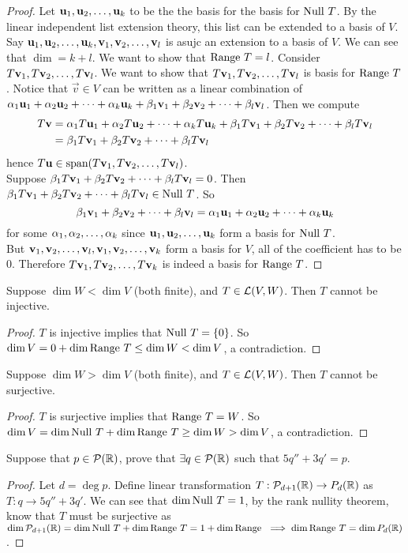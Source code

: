 \begin{proof}
    Let $\li{\vec u}k$ to be the the basis for the basis for $\nul T$. By the linear independent list extension theory, this list can be extended to a basis of $V$. Say $\li{\vec u}k, \li{\vec v}l$ is asujc an extension to a basis of $V$. We can see that $\dim = k + l$. We want to show that $\range T = l$. Consider $\li{T \vec v}l$. We want to show that $\li{T \vec v}l$ is basis for $\range T$. Notice that $\vec v \in V$ can be written as a linear combination of $\lincomb{\alpha}{\vec u}{k} + \lincomb{\beta}{\vec v}{l}$. Then we compute \begin{align*}T\vec v &= \lincomb{\alpha}{T\vec u}{k} + \lincomb{\beta}{T\vec v}{l} \\ &= \lincomb{\beta}{T\vec v}{l} \end{align*} hence $T\vec u \in \spa (\li{T\vec v}{l})$. \\
    Suppose $\lincomb{\beta}{T\vec v}{l} = 0$. Then $\lincomb{\beta}{T\vec v}{l} \in \nul T$. So \[\lincomb{\beta}{\vec v}{l} = \lincomb{\alpha}{\vec u}{k}\] for some $\li{\alpha}{k}$ since $\li{\vec u}k$ form a basis for $\nul T$. \\
    But $\li {\vec v}l, \li{\vec v}k$ form a basis for $V$, all of the coefficient has to be $0$. Therefore $\li{T\vec v}k$ is indeed a basis for $\range T$.
\end{proof}
\begin{example}
    Suppose $\dim W < \dim V$ (both finite), and $T \in \c L(V,W)$. Then $T$ cannot be injective.
\end{example}
\begin{proof}
    $T$ is injective implies that $\nul T = \lb 0 \rb$. So $\dim V = 0 + \dim \range T \leq \dim W < \dim V$, a contradiction. 
\end{proof}
\begin{example}
    Suppose $\dim W > \dim V$ (both finite), and $T \in \c L(V,W)$. Then $T$  cannot be surjective.
\end{example}
\begin{proof}
    $T$ is surjective implies that $\range T = W$. So $\dim V = \dim \nul T + \dim \range T \geq \dim W > \dim V$, a contradiction. 
\end{proof}
\begin{example}
    Suppose that $p \in \c P(\b R)$, prove that $\exists q \in \c P(\b R)$ such that $5q'' + 3q' = p$. \\
\end{example}
\begin{proof}
    Let $d = \deg p$. Define linear transformation $T: \c P_{d +1}(\b R) \to P_d(\b R)$ as $T: q \to 5q''  +3q'$. We can see that $\dim \nul T  = 1$, by the rank nullity theorem, know that $T$ must be surjective as $\dim \c P_{d+1}(\b R) = \dim \nul T + \dim \range T = 1 + \dim \range \implies \dim \range T = \dim P_d(\b R)$.
\end{proof}
